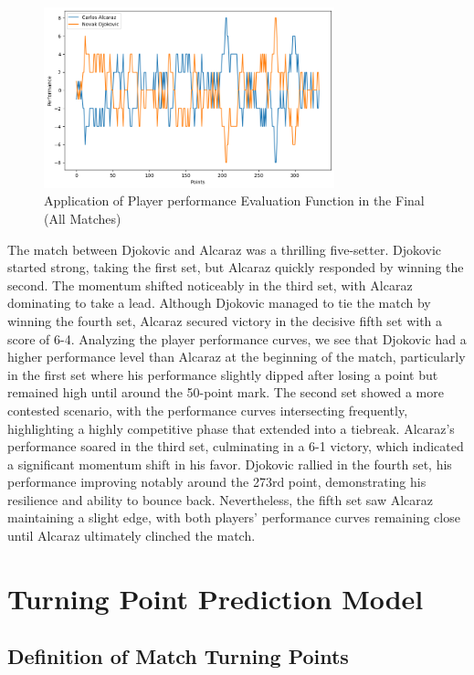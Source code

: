 \documentclass[UTF8]{ctexart} %
\begin{document}
\begin{figure}[H]
    \centering
    \includegraphics[width=0.75\textwidth]{./graph/performance.png}
    \caption{Application of Player performance Evaluation Function in the Final (All Matches)}
\end{figure}

The match between Djokovic and Alcaraz was a thrilling five-setter. Djokovic started strong, 
taking the first set, but Alcaraz quickly responded by winning the second. The momentum shifted 
noticeably in the third set, with Alcaraz dominating to take a lead. Although Djokovic managed 
to tie the match by winning the fourth set, Alcaraz secured victory in the decisive fifth set 
with a score of 6-4.
Analyzing the player performance curves, we see that Djokovic had a higher performance level 
than Alcaraz at the beginning of the match, particularly in the first set where his performance 
slightly dipped after losing a point but remained high until around the 50-point mark. The 
second set showed a more contested scenario, with the performance curves intersecting 
frequently, highlighting a highly competitive phase that extended into a tiebreak. Alcaraz's 
performance soared in the third set, culminating in a 6-1 victory, which indicated a 
significant momentum shift in his favor.
Djokovic rallied in the fourth set, his performance improving notably around the 273rd point, 
demonstrating his resilience and ability to bounce back. Nevertheless, the fifth set saw 
Alcaraz maintaining a slight edge, with both players' performance curves remaining close until 
Alcaraz ultimately clinched the match.

\section{\textbf{Turning Point Prediction Model}}
\subsection{\textbf{Definition of Match Turning Points}}
\end{document}
